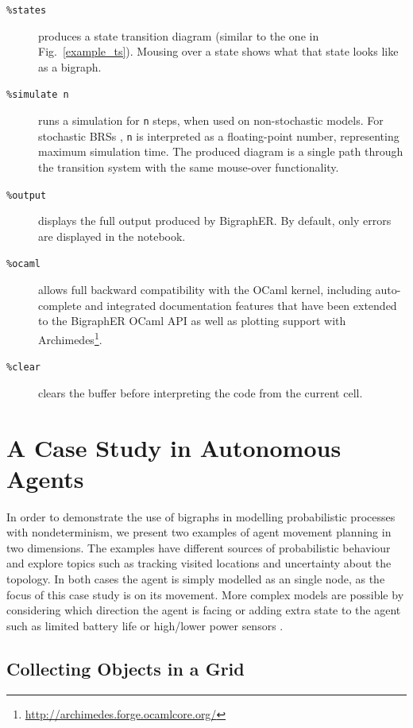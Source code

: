 \documentclass[runningheads]{llncs}
\begin{document}
\begin{description}
  \item[\texttt{\%states}] produces a state transition diagram (similar to the
    one in Fig.~\ref{example_ts}). Mousing over a state shows what that
    state looks like as a bigraph.
  \item[\texttt{\%simulate n}] runs a simulation for \texttt{n} steps, when used
    on non-stochastic models. For stochastic BRSs
    \cite{DBLP:journals/entcs/KrivineMT08}, \texttt{n} is interpreted as a
    floating-point number, representing maximum simulation time. The produced
    diagram is a single path through the transition system with the same
    mouse-over functionality.
  \item[\texttt{\%output}] displays the full output produced by BigraphER. By
    default, only errors are displayed in the notebook.
  \item[\texttt{\%ocaml}] allows full backward compatibility with the OCaml
    kernel, including auto-complete and integrated documentation features that
    have been extended to the BigraphER OCaml API as well as plotting support
    with Archimedes\footnote{\url{http://archimedes.forge.ocamlcore.org/}}.
  \item[\texttt{\%clear}] clears the buffer before interpreting the code from
    the current cell.
\end{description}

\section{A Case Study in Autonomous Agents} \label{case_study}

In order to demonstrate the use of bigraphs in modelling probabilistic
processes with nondeterminism, we present two examples of agent movement
planning in two dimensions. The examples have different sources of probabilistic
behaviour and explore topics such as tracking visited locations and uncertainty
about the topology. In both cases the agent is simply modelled as an single
node, as the focus of this case study is on its movement. More complex models
are possible by considering which direction the agent is facing
\cite{koenig1998xavier} or adding extra state to the agent such as limited
battery life or high/lower power sensors \cite{dblp:conf/nfm/giaquintahimn18}.

\subsection{Collecting Objects in a Grid} \label{first_agent_section}
\end{document}
